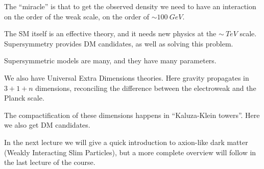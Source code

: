 \documentclass[main.tex]{subfiles}
\begin{document}
The ``miracle'' is that to get the observed density we need 
to have an interaction on the order of the weak scale, on the order of 
\(\sim \SI{100}{GeV}\). 

The SM itself is an effective theory, and it needs new physics 
at the \(\sim \SI{}{TeV}\) scale. 
Supersymmetry provides DM candidates, as well as solving this problem. 

Supersymmetric models are many, and they have many parameters. 

We also have Universal Extra Dimensions theories. 
Here gravity propagates in \(3+1+n\) dimensions, reconciling
the difference between the electroweak and the Planck scale. 

The compactification of these dimensions happens in ``Kaluza-Klein towers''.
Here we also get DM candidates.

In the next lecture we will give a quick introduction to axion-like dark matter (Weakly Interacting Slim Particles), but a more complete overview will follow in the last lecture of the course. 

 
\end{document}
